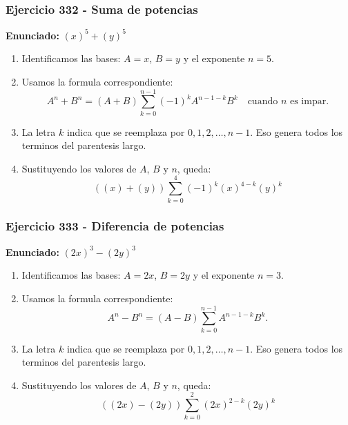 \documentclass[11pt,a4paper]{article}
\begin{document}
\subsubsection*{Ejercicio 332 - Suma de potencias}
\textbf{Enunciado:} $ \left(x\right)^{5}+\left(y\right)^{5} $\par
\begin{enumerate}[leftmargin=2em]
\item Identificamos las bases: \(A=x\), \(B=y\) y el exponente \(n=5\).
\item Usamos la formula correspondiente: \[A^n+B^n=(A+B)\sum_{k=0}^{n-1}(-1)^kA^{n-1-k}B^k\quad\text{cuando }n\text{ es impar}.\]
\item La letra \(k\) indica que se reemplaza por \(0,1,2,\ldots,n-1\). Eso genera todos los terminos del parentesis largo.
\item Sustituyendo los valores de \(A\), \(B\) y \(n\), queda: \[\boxed{\left(\left(x\right)+\left(y\right)\right)\sum_{k=0}^{4}(-1)^k\left(x\right)^{4-k}\left(y\right)^k}\]
\end{enumerate}

\vspace{0.2cm}
\subsubsection*{Ejercicio 333 - Diferencia de potencias}
\textbf{Enunciado:} $ \left(2 x\right)^{3}-\left(2 y\right)^{3} $\par
\begin{enumerate}[leftmargin=2em]
\item Identificamos las bases: \(A=2 x\), \(B=2 y\) y el exponente \(n=3\).
\item Usamos la formula correspondiente: \[A^n-B^n=(A-B)\sum_{k=0}^{n-1}A^{n-1-k}B^k.\]
\item La letra \(k\) indica que se reemplaza por \(0,1,2,\ldots,n-1\). Eso genera todos los terminos del parentesis largo.
\item Sustituyendo los valores de \(A\), \(B\) y \(n\), queda: \[\boxed{\left(\left(2 x\right)-\left(2 y\right)\right)\sum_{k=0}^{2}\left(2 x\right)^{2-k}\left(2 y\right)^k}\]
\end{enumerate}

\vspace{0.2cm}
\end{document}
